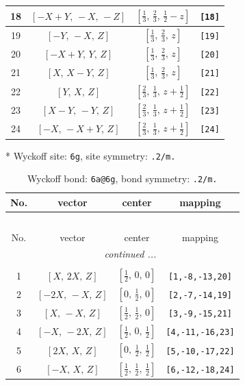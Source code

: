 \documentclass[fleqn,8pt]{jsarticle}
\begin{document}
\begin{longtable}{cccc}
18 & $\left[ - X + Y,\, - X,\, - Z \right]$ & $\left[ \frac{1}{3},\, \frac{2}{3},\, \frac{1}{2} - z \right]$ & {\tt [18]} \\ \hline
19 & $\left[ - Y,\, - X,\, Z \right]$ & $\left[ \frac{1}{3},\, \frac{2}{3},\, z \right]$ & {\tt [19]} \\ \hline
20 & $\left[ - X + Y,\, Y,\, Z \right]$ & $\left[ \frac{1}{3},\, \frac{2}{3},\, z \right]$ & {\tt [20]} \\ \hline
21 & $\left[ X,\, X - Y,\, Z \right]$ & $\left[ \frac{1}{3},\, \frac{2}{3},\, z \right]$ & {\tt [21]} \\ \hline
22 & $\left[ Y,\, X,\, Z \right]$ & $\left[ \frac{2}{3},\, \frac{1}{3},\, z + \frac{1}{2} \right]$ & {\tt [22]} \\ \hline
23 & $\left[ X - Y,\, - Y,\, Z \right]$ & $\left[ \frac{2}{3},\, \frac{1}{3},\, z + \frac{1}{2} \right]$ & {\tt [23]} \\ \hline
24 & $\left[ - X,\, - X + Y,\, Z \right]$ & $\left[ \frac{2}{3},\, \frac{1}{3},\, z + \frac{1}{2} \right]$ & {\tt [24]} \\
\end{longtable}
* Wyckoff site: {\tt 6g}, site symmetry: {\tt .2/m.}
\renewcommand{\arraystretch}{1.2}
\begin{longtable}{cccc}
\caption{Wyckoff bond: {\tt 6a@6g}, bond symmetry: {\tt .2/m.}}
 \\
 \hline \hline
No. & vector & center & mapping \\ \hline \endfirsthead

\multicolumn{3}{l}{\tablename\ \thetable{}} \\
 \hline \hline
No. & vector & center & mapping \\ \hline \endhead

 \hline \hline
\multicolumn{3}{r}{\footnotesize\it continued ...} \\ \endfoot

 \hline \hline
\multicolumn{3}{r}{} \\ \endlastfoot

1 & $\left[ X,\, 2 X,\, Z \right]$ & $\left[ \frac{1}{2},\, 0,\, 0 \right]$ & {\tt [1,-8,-13,20]} \\ \hline
2 & $\left[ - 2 X,\, - X,\, Z \right]$ & $\left[ 0,\, \frac{1}{2},\, 0 \right]$ & {\tt [2,-7,-14,19]} \\ \hline
3 & $\left[ X,\, - X,\, Z \right]$ & $\left[ \frac{1}{2},\, \frac{1}{2},\, 0 \right]$ & {\tt [3,-9,-15,21]} \\ \hline
4 & $\left[ - X,\, - 2 X,\, Z \right]$ & $\left[ \frac{1}{2},\, 0,\, \frac{1}{2} \right]$ & {\tt [4,-11,-16,23]} \\ \hline
5 & $\left[ 2 X,\, X,\, Z \right]$ & $\left[ 0,\, \frac{1}{2},\, \frac{1}{2} \right]$ & {\tt [5,-10,-17,22]} \\ \hline
6 & $\left[ - X,\, X,\, Z \right]$ & $\left[ \frac{1}{2},\, \frac{1}{2},\, \frac{1}{2} \right]$ & {\tt [6,-12,-18,24]} \\
\end{longtable}
\end{document}
